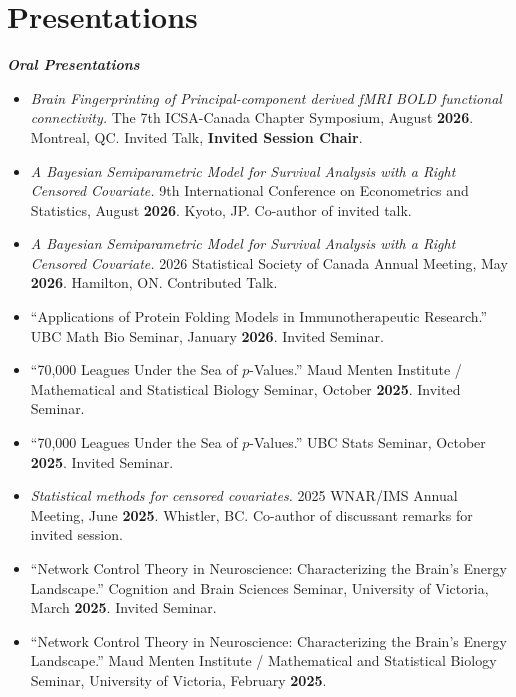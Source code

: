 \documentclass[letterpaper,11pt]{article}
\newenvironment{cvlist}
  {\begin{itemize}[leftmargin=0.15in, label={}, itemsep=2pt, parsep=0pt, topsep=2pt]\small}
  {\end{itemize}}
\begin{document}
\section{Presentations}
\textbf{\small \textit{Oral Presentations}}
\vspace{-5pt}
\begin{cvlist}
\item \textit{Brain Fingerprinting of Principal-component derived fMRI BOLD functional connectivity.}
The 7th ICSA-Canada Chapter Symposium, August \textbf{2026}. Montreal, QC.
Invited Talk, \textbf{Invited Session Chair}. 

\item \textit{A Bayesian Semiparametric Model for Survival Analysis with a Right Censored Covariate.}
9th International Conference on Econometrics and Statistics, August \textbf{2026}. Kyoto, JP.
Co-author of invited talk.

\item \textit{A Bayesian Semiparametric Model for Survival Analysis with a Right Censored Covariate.}
2026 Statistical Society of Canada Annual Meeting, May \textbf{2026}. Hamilton, ON. Contributed Talk.

\item ``Applications of Protein Folding Models in Immunotherapeutic Research.''
UBC Math Bio Seminar, January \textbf{2026}. Invited Seminar.

\item ``70,000 Leagues Under the Sea of $p$-Values.''
Maud Menten Institute / Mathematical and Statistical Biology Seminar, October \textbf{2025}. Invited Seminar.

\item ``70,000 Leagues Under the Sea of $p$-Values.''
UBC Stats Seminar, October \textbf{2025}. Invited Seminar.

\item \textit{Statistical methods for censored covariates.}
2025 WNAR/IMS Annual Meeting, June \textbf{2025}. Whistler, BC.
Co-author of discussant remarks for invited session.

\item ``Network Control Theory in Neuroscience: Characterizing the Brain's Energy Landscape.''
Cognition and Brain Sciences Seminar, University of Victoria, March \textbf{2025}. Invited Seminar.

\item ``Network Control Theory in Neuroscience: Characterizing the Brain's Energy Landscape.''
Maud Menten Institute / Mathematical and Statistical Biology Seminar, University of Victoria, February \textbf{2025}.
\end{cvlist}
\end{document}
